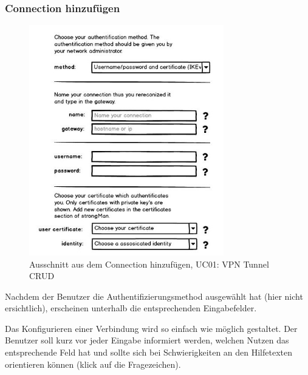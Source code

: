 \subsubsection{Connection hinzufügen}
\noindent\begin{minipage}[t]{0.55\textwidth}
\vspace{0pt}
    \begin{figure}[H]
    	\centering
    	\includegraphics[width=240pt]{images/mockups/short_con_config.jpg}
    	\caption{Ausschnitt aus dem Connection hinzufügen,  UC01: VPN Tunnel CRUD}
    \end{figure}
\end{minipage}
\hfill
\begin{minipage}[t]{0.45\textwidth}
\vspace{0pt}
Nachdem der Benutzer die Authentifizierungsmethod ausgewählt hat (hier nicht ersichtlich), erscheinen unterhalb die entsprechenden Eingabefelder.

Das Konfigurieren einer Verbindung wird so einfach wie möglich gestaltet. Der Benutzer soll kurz vor jeder Eingabe informiert werden, welchen Nutzen das entsprechende Feld hat und sollte sich bei Schwierigkeiten an den Hilfetexten orientieren können (klick auf die Fragezeichen).
\end{minipage}